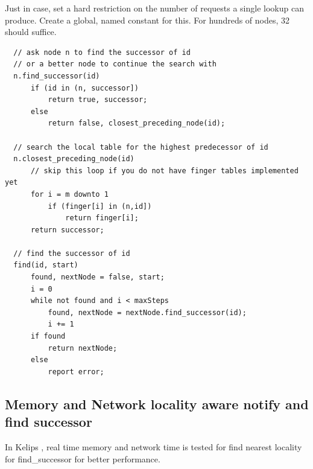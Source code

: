 \documentclass[acmlarge]{acmart}
\begin{document}
Just in case, set a hard restriction on the number of requests a single lookup can produce. Create a global, named constant for this. For hundreds of nodes, 32 should suffice.

\begin{lstlisting}
  // ask node n to find the successor of id
  // or a better node to continue the search with
  n.find_successor(id)
      if (id in (n, successor])
          return true, successor;
      else
          return false, closest_preceding_node(id);

  // search the local table for the highest predecessor of id
  n.closest_preceding_node(id)
      // skip this loop if you do not have finger tables implemented yet
      for i = m downto 1
          if (finger[i] in (n,id])
              return finger[i];
      return successor;

  // find the successor of id
  find(id, start)
      found, nextNode = false, start;
      i = 0
      while not found and i < maxSteps
          found, nextNode = nextNode.find_successor(id);
          i += 1
      if found
          return nextNode;
      else
          report error;      
  \end{lstlisting}

\subsection{Memory and Network locality aware notify and find successor}
In Kelips \cite{gupta2003kelips}, real time memory and network time is tested for find nearest locality for find\_successor for better performance.



\end{document}
